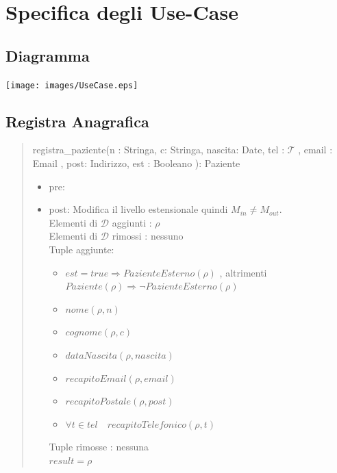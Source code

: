 \documentclass[12pt, letterpaper]{article}
\begin{document}
\section{Specifica degli Use-Case}
\subsection{Diagramma}
\begin{center}
    \texttt{[image: images/UseCase.eps]}
\end{center} \newpage
\subsection{Registra Anagrafica}
    \begin{quote}
        registra\_paziente(n : Stringa, c: Stringa, nascita: Date, tel : $\mathcal{T}$ , email : Email , post: Indirizzo, est : Booleano ): Paziente
        \begin{itemize}
            \item pre: 
            \item post: Modifica il livello estensionale quindi $M_{in} \neq M_{out}$.\\
            Elementi di $\mathcal{D}$ aggiunti : $\rho$\\
            Elementi di $\mathcal{D}$ rimossi : nessuno\\
            Tuple aggiunte:
            \begin{itemize}
                \item $est = true \Rightarrow PazienteEsterno(\rho)$ , altrimenti $Paziente(\rho)\Rightarrow \lnot PazienteEsterno(\rho)$
                \item $nome(\rho, n)$
                \item $cognome(\rho,c)$
                \item $dataNascita(\rho, nascita)$
                \item $recapitoEmail(\rho,email)$
                \item $recapitoPostale(\rho, post)$
                \item $\forall t \in tel \quad recapitoTelefonico(\rho,t)$
            \end{itemize}
            Tuple rimosse : nessuna  \\
            $result = \rho$
        \end{itemize}
    \end{quote}
\end{document}
